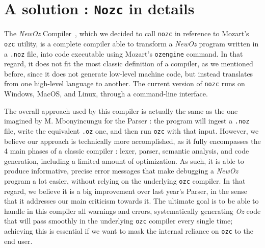 \section{A solution : \texttt{Nozc} in details}\label{sec:ch3-nozc}
The \textit{NewOz} Compiler~\cite{NozcGitHub}, which we decided to call \texttt{nozc} in reference to Mozart's \texttt{ozc} utility, is a complete compiler able to transform a \textit{NewOz} program written in a \texttt{.noz} file, into code executable using Mozart's \texttt{ozengine} command.
In that regard, it does not fit the most classic definition of a compiler, as we mentioned before, since it does not generate low-level machine code, but instead translates from one high-level language to another.
The current version of \texttt{nozc} runs on Windows, MacOS, and Linux, through a command-line interface.\newline

The overall approach used by this compiler is actually the same as the one imagined by M. Mbonyincungu for the Parser : the program will ingest a \texttt{.noz} file, write the equivalent \texttt{.oz} one, and then run \texttt{ozc} with that input.
However, we believe our approach is technically more accomplished, as it fully encompasses the 4 main phases of a classic compiler : lexer, parser, semantic analysis, and code generation, including a limited amount of optimization.
As such, it is able to produce informative, precise error messages that make debugging a \textit{NewOz} program a lot easier, without relying on the underlying \texttt{ozc} compiler.
In that regard, we believe it is a big improvement over last year's Parser, in the sense that it addresses our main criticism towards it.
The ultimate goal is to be able to handle in this compiler all warnings and errors, systematically generating \textit{Oz} code that will pass smoothly in the underlying \texttt{ozc} compiler every single time;
achieving this is essential if we want to mask the internal reliance on \texttt{ozc} to the end user.\newline

